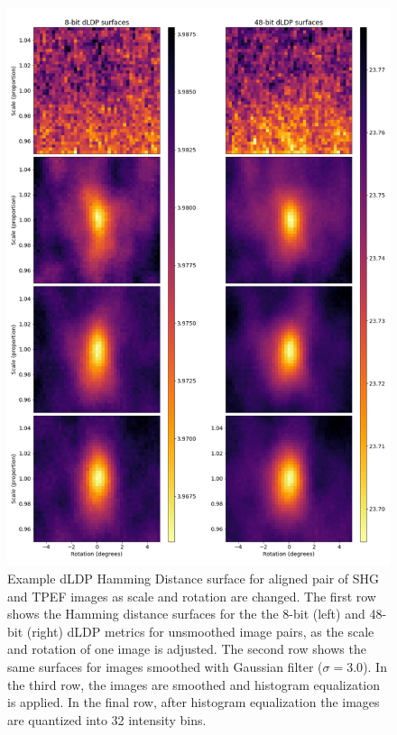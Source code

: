 \documentclass{report}
\begin{document}
\begin{figure}
\centering
\includegraphics[width = 5.5 in]{bothgrids_bothblur_im24.pdf}

\caption{Example dLDP Hamming Distance surface for aligned pair of SHG and TPEF images as scale and rotation are changed. The first row shows the Hamming distance surfaces for the the 8-bit (left) and 48-bit (right) dLDP metrics for unsmoothed image pairs, as the scale and rotation of one image is adjusted. The second row shows the same surfaces for images smoothed with Gaussian filter ($\sigma=3.0$). In the third row, the images are smoothed and histogram equalization is applied. In the final row, after histogram equalization the images are quantized into 32 intensity bins.}
\label{fig:dLDPsurf}
\end{figure}
\end{document}
